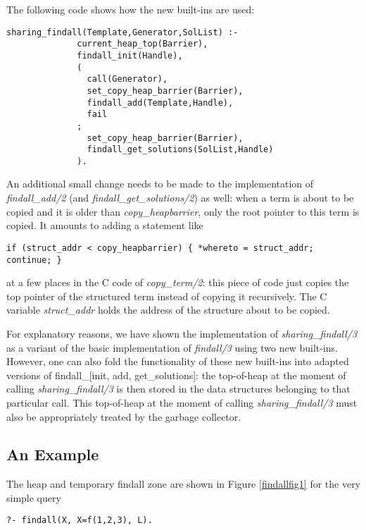 \documentclass{tlp}
\begin{document}
The following code shows how the new built-ins are used:

\begin{Verbatim}[fontsize=\small, frame=single,samepage=true]
       sharing_findall(Template,Generator,SolList) :-
              current_heap_top(Barrier),
              findall_init(Handle),
              (
                call(Generator), 
                set_copy_heap_barrier(Barrier),
                findall_add(Template,Handle),
                fail
              ;
                set_copy_heap_barrier(Barrier),
                findall_get_solutions(SolList,Handle)
              ).
\end{Verbatim}


An additional small change needs to be made to the implementation
of {\em findall\_add/2} (and {\em findall\_get\_solutions/2}) as well: when a term
is about to be copied and it is older than {\em copy\_heapbarrier},
only the root pointer to this term is copied. It amounts to adding a
statement like
\begin{Verbatim}[fontsize=\small, frame=single,samepage=true]
   if (struct_addr < copy_heapbarrier) { *whereto = struct_addr; continue; }
\end{Verbatim}
at a few places in the C code of {\em copy\_term/2}: this piece of code
just copies the top pointer of the structured term instead of copying
it recursively. The C variable {\em struct\_addr} holds the address
of the structure about to be copied.


For explanatory reasons, we have shown the implementation of {\em
  sharing\_findall/3} as a variant of the basic implementation of {\em
  findall/3} using two new built-ins. However, one can also fold the
functionality of these new built-ins into adapted versions of
findall\_[init, add, get\_solutions]: the top-of-heap at the moment of
calling {\em sharing\_findall/3} is then stored in the data structures
belonging to that particular call. This top-of-heap at the moment of
calling {\em sharing\_findall/3} must also be appropriately treated by
the garbage collector.



\subsection{An Example}

The heap and temporary findall zone are shown in Figure \ref{findallfig1} for
the very simple query

\begin{Verbatim}[fontsize=\small, frame=single,samepage=true]
       ?- findall(X, X=f(1,2,3), L).
\end{Verbatim}
\end{document}
